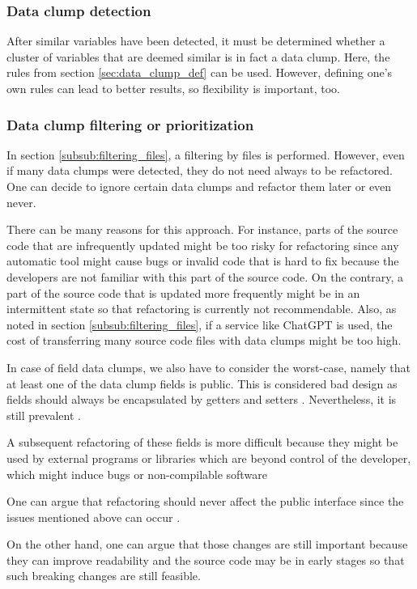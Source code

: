 \subsubsection{Data clump detection}
After similar variables have been detected, it must be determined whether a cluster of variables that are deemed similar is in fact a data clump. Here, the rules from section \ref{sec:data_clump_def} can be used. However, defining one's own rules can lead to better results, so flexibility is important, too. 

\subsubsection{Data clump filtering or prioritization} \label{subsub:filtering_data_clumps}
In section \ref{subsub:filtering_files}, a filtering by files is performed. However, even if many data clumps were detected, they do not need always to be refactored. One can decide to ignore certain data clumps and refactor them later or even never. 

There can be many reasons for this approach. For instance, parts of the source code that are infrequently updated might be too risky for refactoring since any automatic tool might cause bugs or invalid code that is hard to fix because the developers are not familiar with this part of the source code. On the contrary, a part of the source code that is updated more frequently might be in an intermittent state so that refactoring is currently not recommendable. Also, as noted in section  \ref{subsub:filtering_files}, if a service like ChatGPT is used, the cost of transferring many source code files with data clumps might be too high. 

In case of field data clumps, we also have to consider the worst-case, namely that  at least one of the data clump fields is public. This is considered bad design as fields should always be encapsulated by getters and setters \cite{5680918}. Nevertheless, it is still prevalent \cite{5076631}.

A subsequent refactoring of these fields is more difficult because they might be used by external programs or libraries which are beyond control of the developer, which might induce bugs or non-compilable software 

One can argue that refactoring should never affect the public interface since the issues mentioned above can occur \cite{10.1145/1352678.1352681}.

On the other hand, one can argue that those changes are still important because they can improve readability and the source code may be in early stages so that such breaking changes are still feasible. 

